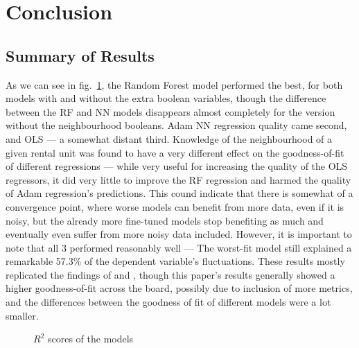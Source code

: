 \documentclass[12pt]{report}
\begin{document}
\section{Conclusion}
\subsection{Summary of Results}

As we can see in fig.~\ref{fig:summary}, the Random Forest model performed the best, for both models with and without the extra boolean variables, though the difference between the RF and NN models disappears almost completely for the version without the neighbourhood booleans. Adam NN regression quality came second, and OLS --- a somewhat distant third. Knowledge of the neighbourhood of a given rental unit was found to have a very different effect on the goodness-of-fit of different regressions --- while very useful for increasing the quality of the OLS regressors, it did very little to improve the RF regression and harmed the quality of Adam regression's predictions. This cound indicate that there is somewhat of a convergence point, where worse models can benefit from more data, even if it is noisy, but the already more fine-tuned models stop benefiting as much and eventually even suffer from more noisy data included. However, it is important to note that all 3 performed reasonably well --- The worst-fit model still explained a remarkable 57.3\% of the dependent variable's fluctuations. These results mostly replicated the findings of \textcite{yoshida2022} and \textcite{neloy2019}, though this paper's results generally showed a higher goodness-of-fit across the board, possibly due to inclusion of more metrics, and the differences between the goodness of fit of different models were a lot smaller.

\begin{figure}[H]
	\centering
	\caption{$R^2$ scores of the models}\label{fig:summary}
\end{figure}
\end{document}
